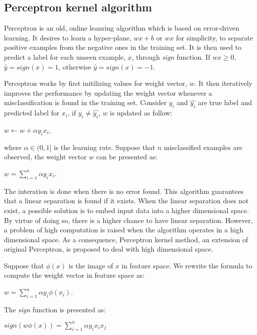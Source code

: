 \subsection{Perceptron kernel algorithm}
Perceptron is an old, online leanring algorithm which is based on error-driven learning. It desires to learn a hyper-plane, $wx+b$ or $wx$ for simplicity, to separate positive examples from the negative ones in the training set. It is then used to predict a label for each unseen example, $x$, through \textit{sign} function. If $wx \geq 0$, $\hat{y} = sign(x) = 1$, otherwise $\hat{y} = sign\left( x\right)  = -1$. 

Perceptron works by first initilizing values for weight vector, $w$. It then iteratively improves the performance by updating the weight vector whenever a misclassification is found in the training set. Consider $y_i$ and $\hat{y_i}$ are true label and predicted label for $x_i$, if $y_i \neq \hat{y_i}$, $w$ is updated as follow:
\begin{center}
$w \longleftarrow w + \alpha y_i x_i$,
\end{center}
where $\alpha \in (0,1]$ is the learning rate. Suppose that $n$ misclassified examples are observed, the weight vector $w$ can be presented as:
\begin{center}
$w = \sum_{i=1}^{n} \alpha y_i x_i$.
\end{center}  
The interation is done when there is no error found. This algorithm guarantees that a linear separation is found if it exists. When the linear separation does not exist, a possible solution is to embed input data into a higher dimensional space. By virtue of doing so, there is a higher chance to have linear separation. However, a problem of high computation is raised when the algorithm operates in a high dimensional space. As a consequence, Perceptron kernel method, an extension of original Perceptron, is proposed to deal with high dimensional space.

Suppose that $\phi(x)$ is the image of $x$ in feature space. We rewrite the formula to compute the weight vector in feature space as:\\
\begin{center}
$w = \sum_{i=1}^{n} \alpha y_i \phi(x_i)$.
\end{center}
The \textit{sign} function is presented as:
\begin{center}
$sign(w \phi(x)) = \sum_{i=1}^{n} \alpha y_i x_i x_j$
\end{center}

